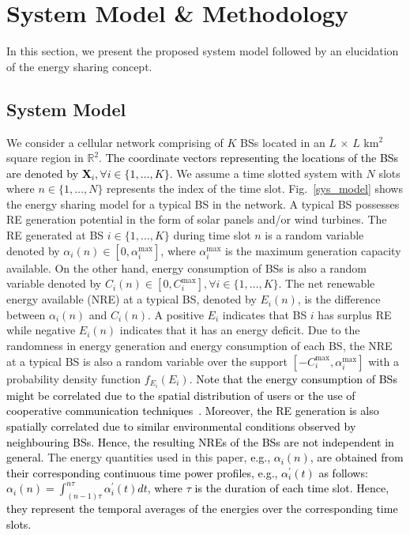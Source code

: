 \documentclass[10pt, letter,twocolumn]{IEEEtran}
\begin{document}
\section{System Model \& Methodology} \label{sec_sys_model}
In this section, we present the proposed system model followed by an elucidation of the energy sharing concept.
\vspace{-0.0cm}
\subsection{System Model}
We consider a cellular network comprising of $K$ BSs located in an $L$ $\times$ $L$ km$^2$ square region in $\mathbb{R}^2$. \textcolor{black}{The coordinate vectors representing the locations of the BSs are denoted by $\mathbf{X}_{i}, \forall i \in \{1,\ldots,K\}$}. We assume a time slotted system with $N$ slots where $n \in \{1,\ldots,N\}$ represents the index of the time slot. Fig.~\ref{sys_model} shows the energy sharing model for a typical BS in the network. A typical BS possesses RE generation potential in the form of solar panels and/or wind turbines. The RE generated at BS $i \in \{1,\ldots,K\}$ during time slot $n$ is a random variable denoted by $\alpha_{i}(n) \in [0,\alpha^{\max}_{i}]$, where $\alpha^{\max}_{i}$ is the maximum generation capacity available. On the other hand, energy consumption of BSs is also a random variable denoted by $C_{i}(n) \in [0,C_{i}^{\max}], \forall i \in \{1,\ldots,K\}$. The net renewable energy available (NRE) at a typical BS, denoted by $E_{i}(n)$, is the difference between $\alpha_{i}(n)$ and $C_{i}(n)$. A positive $E_{i}$ indicates that BS $i$ has surplus RE while negative $E_{i}(n)$ indicates that it has an energy deficit. Due to the randomness in energy generation and energy consumption of each BS, the NRE at a typical BS is also a random variable over the support $[-C_{i}^{\max}, \alpha_{i}^{\max}]$ with a probability density function $f_{E_{i}}(E_{i})$. \textcolor{black}{Note that the energy consumption of BSs might be correlated due to the spatial distribution of users or the use of cooperative communication techniques~\cite{reviewer4_suggested}. Moreover, the RE generation is also spatially correlated due to similar environmental conditions observed by neighbouring BSs. Hence, the resulting NREs of the BSs are not independent in general.} The energy quantities used in this paper, \textcolor{black}{e.g., $\alpha_{i}(n)$, are obtained from their corresponding continuous time power profiles, e.g., $\alpha_{i}^{\prime}(t)$ as follows: $\alpha_{i}(n) =  \int_{(n-1)\tau}^{n\tau} \alpha_{i}^{\prime}(t) dt$, where $\tau$ is the duration of each time slot. Hence, they represent the temporal averages of the energies over the corresponding time slots.}
\end{document}
